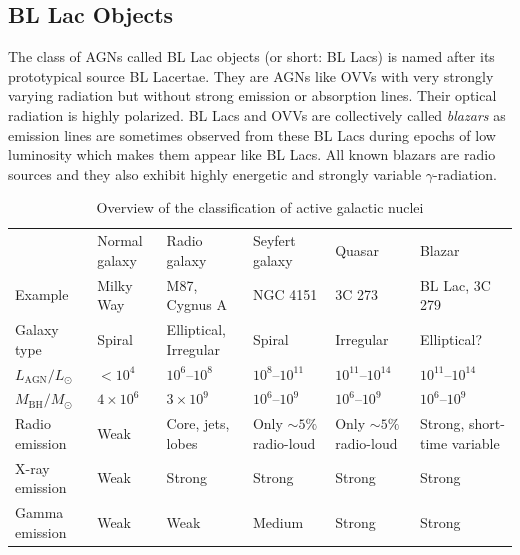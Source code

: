 \documentclass[a4paper,11pt]{report}
\newcommand{\lightmidrule}{
\arrayrulecolor{gray!40}\midrule\arrayrulecolor{black}
}
\begin{document}
\subsection{BL Lac Objects}
The class of AGNs called BL Lac objects (or short: BL Lacs) is named after its prototypical source BL Lacertae. They are AGNs like OVVs with very strongly varying radiation but without strong emission or absorption lines. Their optical radiation is highly polarized. BL Lacs and OVVs are collectively called \textit{blazars} as emission lines are sometimes observed from these BL Lacs during epochs of low luminosity which makes them appear like BL Lacs. All known blazars are radio sources and they also exhibit highly energetic and strongly variable $\gamma$-radiation.


\begin{table}[ht!]
\centering
\footnotesize
\caption{Overview of the classification of active galactic nuclei}
\begin{tabularx}{\textwidth}{lXXXXX}
\toprule
 & Normal galaxy & Radio galaxy & Seyfert galaxy & Quasar & Blazar \\
\lightmidrule

Example
& Milky Way
& M87, Cygnus A
& NGC 4151
& 3C 273
& BL Lac, 3C 279 \\
\lightmidrule

Galaxy type
& Spiral
& Elliptical, Irregular
& Spiral
& Irregular
& Elliptical? \\
\lightmidrule

$L_{\mathrm{AGN}}/L_\odot$
& $<10^4$
& $10^6$--$10^8$
& $10^8$--$10^{11}$
& $10^{11}$--$10^{14}$
& $10^{11}$--$10^{14}$ \\
\lightmidrule

$M_{\mathrm{BH}}/M_\odot$
& $4\times10^6$
& $3\times10^9$
& $10^6$--$10^9$
& $10^6$--$10^9$
& $10^6$--$10^9$ \\
\lightmidrule

Radio emission
& Weak
& Core, jets, lobes
& Only $\sim 5\%$ radio-loud
& Only $\sim 5\%$ radio-loud
& Strong, short-time variable \\
\lightmidrule

X-ray emission
& Weak
& Strong
& Strong
& Strong
& Strong \\
\lightmidrule

Gamma emission
& Weak
& Weak
& Medium
& Strong
& Strong \\
\bottomrule
\end{tabularx}
\end{table}
\end{document}
